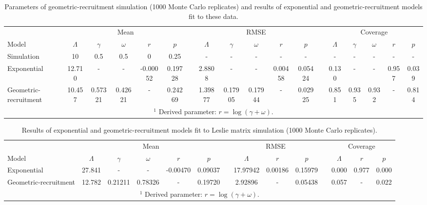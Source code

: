 \documentclass{article}
\begin{document}

\begin{table}
  \centering
  \footnotesize
  \caption{Parameters of geometric-recruitment simulation (1000 Monte Carlo replicates)
  and results of exponential and geometric-recruitment models fit to these data.}
  \begin{tabular}{lccccccccccccccccc}
    \hline
    & \multicolumn{5}{c}{Mean} &&
    \multicolumn{5}{c}{RMSE} &&
    \multicolumn{5}{c}{Coverage} \\
    \cline{2-6}     \cline{8-12}    \cline{14-18}
    Model & $\Lambda$ & $\gamma$ & $\omega$ & $r$\footnotemark[1] & $p$ &&
    $\Lambda$ & $\gamma$ & $\omega$ & $r$ & $p$ && 
    $\Lambda$ & $\gamma$ & $\omega$ & $r$ & $p$ \\
    \hline
Simulation & 
10	&0.5	&0.5	&0	&0.25	&&-	&-	&-	&-	&-	&&-	&-	&-	&-	&-\\
Exponential &
12.710	&-	&- 	&-0.00052 	&0.19728	&&
2.8808	&-	&- 	&0.00458	&0.05424	&&
0.130	&-	&- 	&0.957 	&0.039 \\
Geometric-recruitment &
10.457	&0.57321	&0.42621	&- 	&0.24269	&&
1.39877 &0.17905	&0.17944	&- 	&0.02925	&&
0.851	&0.935	&0.932	&- 	&0.814 \\
  \hline
  \multicolumn{18}{c}{$^{1}$ Derived parameter: $r = \log(\gamma + \omega)$.}
  \end{tabular}
  \label{tab:simgeom}
\end{table}

\clearpage

\begin{table}
  \centering
  \footnotesize
  \caption{Results of exponential and geometric-recruitment models fit to Leslie matrix simulation (1000 Monte Carlo replicates).}
  \begin{tabular}{lccccccccccccc}
    \hline
    & \multicolumn{5}{c}{Mean} &&
    \multicolumn{3}{c}{RMSE} &&
    \multicolumn{3}{c}{Coverage} \\
    \cline{2-6}     \cline{8-10}    \cline{12-14}
    Model & $\Lambda$ & $\gamma$ & $\omega$ & $r$\footnotemark[1] & $p$ &&
    $\Lambda$ & $r$ & $p$ && 
    $\Lambda$ & $r$ & $p$ \\
    \hline
Exponential &
27.841	&-	&- 	&-0.00470	&0.09037	&&
17.97942	&0.00186 	&0.15979	&&
0.000 		&0.977 	&0.000 \\
Geometric-recruitment &
12.782	&0.21211	&0.78326	&-	&0.19720	&&
2.92896 	&- 	&0.05438	&&
0.057		&- 	&0.022 \\
  \hline
  \multicolumn{14}{c}{$^{1}$ Derived parameter: $r = \log(\gamma + \omega)$.}
  \end{tabular}
  \label{tab:simmat}
\end{table}
\clearpage
\end{document}
